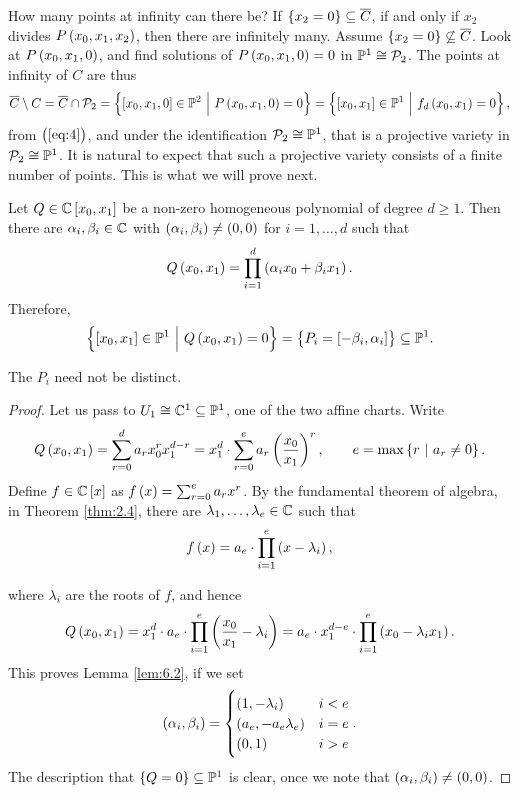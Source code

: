How many points at infinity can there be? If $ \cbr{x_2 = 0} \subseteq \overline{C} $, if and only if $ x_2 $ divides $ P\br{x_0, x_1, x_2} $, then there are infinitely many. Assume $ \cbr{x_2 = 0} \not\subseteq \overline{C} $. Look at $ P\br{x_0, x_1, 0} $, and find solutions of $ P\br{x_0, x_1, 0} = 0 $ in $ \mathbb{P}^1 \cong \mathcal{P}_2 $. The points at infinity of $ C $ are thus
$$ \overline{C} \setminus C = \overline{C} \cap \PPP_2 = \cbr{\sbr{x_0, x_1, 0} \in \PP^2 \st P\br{x_0, x_1, 0} = 0} = \cbr{\sbr{x_0, x_1} \in \PP^1 \st f_d\br{x_0, x_1} = 0}, $$
from $ \br{\ref{eq:4}} $, and under the identification $ \mathcal{P}_2 \cong \mathbb{P}^1 $, that is a projective variety in $ \mathcal{P}_2 \cong \mathbb{P}^1 $. It is natural to expect that such a projective variety consists of a finite number of points. This is what we will prove next.

\begin{lemma}
\label{lem:6.2}
Let $ Q \in \CC\sbr{x_0, x_1} $ be a non-zero homogeneous polynomial of degree $ d \ge 1 $. Then there are $ \alpha_i, \beta_i \in \mathbb{C} $ with $ \br{\alpha_i, \beta_i} \ne \br{0, 0} $ for $ i = 1, \dots, d $ such that
$$ Q\br{x_0, x_1} = \prod_{i = 1}^d \br{\alpha_ix_0 + \beta_ix_1}. $$
Therefore,
$$ \cbr{\sbr{x_0, x_1} \in \PP^1 \st Q\br{x_0, x_1} = 0} = \cbr{P_i = \sbr{-\beta_i, \alpha_i}} \subseteq \PP^1. $$
\end{lemma}

\begin{note*}
The $ P_i $ need not be distinct.
\end{note*}

\begin{proof}
Let us pass to $ U_1 \cong \mathbb{C}^1 \subseteq \mathbb{P}^1 $, one of the two affine charts. Write
$$ Q\br{x_0, x_1} = \sum_{r = 0}^d a_rx_0^rx_1^{d - r} = x_1^d \cdot \sum_{r = 0}^e a_r\br{\dfrac{x_0}{x_1}}^r, \qquad e = \max\cbr{r \st a_r \ne 0}. $$
Define $ f \in \CC\sbr{x} $ as $ f\br{x} = \sum_{r = 0}^e a_rx^r $. By the fundamental theorem of algebra, in Theorem \ref{thm:2.4}, there are $ \lambda_1, \dots, \lambda_e \in \mathbb{C} $ such that
$$ f\br{x} = a_e \cdot \prod_{i = 1}^e \br{x - \lambda_i}, $$

\pagebreak

where $ \lambda_i $ are the roots of $ f $, and hence
$$ Q\br{x_0, x_1} = x_1^d \cdot a_e \cdot \prod_{i = 1}^e \br{\dfrac{x_0}{x_1} - \lambda_i} = a_e \cdot x_1^{d - e} \cdot \prod_{i = 1}^e \br{x_0 - \lambda_ix_1}. $$
This proves Lemma \ref{lem:6.2}, if we set
$$ \br{\alpha_i, \beta_i} =
\begin{cases}
\br{1, -\lambda_i} & i < e \\
\br{a_e, -a_e\lambda_e} & i = e \\
\br{0, 1} & i > e
\end{cases}.
$$
The description that $ \cbr{Q = 0} \subseteq \PP^1 $ is clear, once we note that $ \br{\alpha_i, \beta_i} \ne \br{0, 0} $.
\end{proof}

